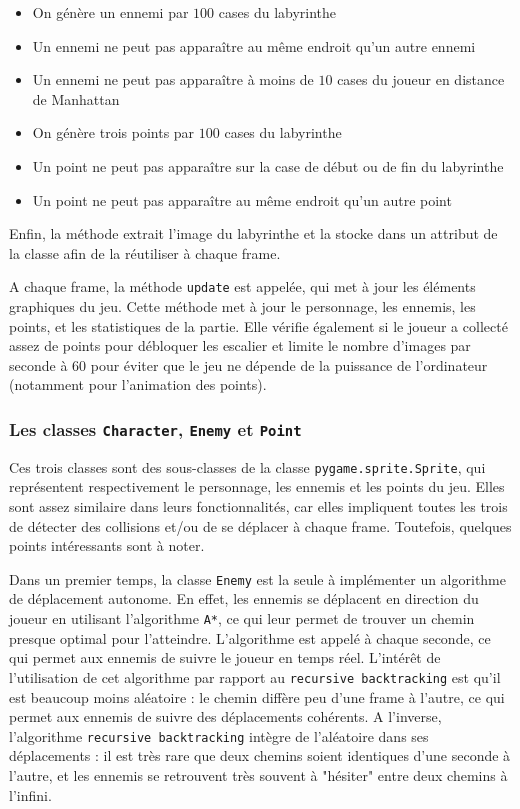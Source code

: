 \documentclass[12pt]{scrreprt} %
\begin{document}
\begin{itemize}
    \item On génère un ennemi par $100$ cases du labyrinthe
    \item Un ennemi ne peut pas apparaître au même endroit qu'un autre ennemi
    \item Un ennemi ne peut pas apparaître à moins de $10$ cases du joueur en distance de Manhattan
    \item On génère trois points par $100$ cases du labyrinthe
    \item Un point ne peut pas apparaître sur la case de début ou de fin du labyrinthe
    \item Un point ne peut pas apparaître au même endroit qu'un autre point
\end{itemize}

Enfin, la méthode extrait l'image du labyrinthe et la stocke dans un attribut de la classe afin de la réutiliser à chaque frame.

A chaque frame, la méthode \texttt{update} est appelée, qui met à jour les éléments graphiques du jeu. Cette méthode met à jour le personnage, les ennemis, les points, et les statistiques de la partie. Elle vérifie également si le joueur a collecté assez de points pour débloquer les escalier et limite le nombre d'images par seconde à $60$ pour éviter que le jeu ne dépende de la puissance de l'ordinateur (notamment pour l'animation des points).

\subsubsection{Les classes \texttt{Character}, \texttt{Enemy} et \texttt{Point}}

Ces trois classes sont des sous-classes de la classe \texttt{pygame.sprite.Sprite}, qui représentent respectivement le personnage, les ennemis et les points du jeu. Elles sont assez similaire dans leurs fonctionnalités, car elles impliquent toutes les trois de détecter des collisions et/ou de se déplacer à chaque frame. Toutefois, quelques points intéressants sont à noter.

Dans un premier temps, la classe \texttt{Enemy} est la seule à implémenter un algorithme de déplacement autonome. En effet, les ennemis se déplacent en direction du joueur en utilisant l'algorithme \texttt{A*}, ce qui leur permet de trouver un chemin presque optimal pour l'atteindre. L'algorithme est appelé à chaque seconde, ce qui permet aux ennemis de suivre le joueur en temps réel. L'intérêt de l'utilisation de cet algorithme par rapport au \texttt{recursive backtracking} est qu'il est beaucoup moins aléatoire : le chemin diffère peu d'une frame à l'autre, ce qui permet aux ennemis de suivre des déplacements cohérents. A l'inverse, l'algorithme \texttt{recursive backtracking} intègre de l'aléatoire dans ses déplacements : il est très rare que deux chemins soient identiques d'une seconde à l'autre, et les ennemis se retrouvent très souvent à "hésiter" entre deux chemins à l'infini.
\end{document}
